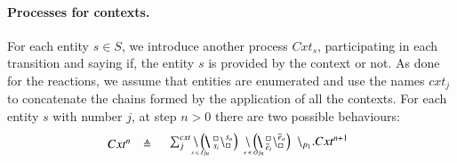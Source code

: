 \paragraph{Processes for contexts.}
For each entity $s \in S$, we introduce another process $Cxt_s$,  participating in each transition and saying if, the entity $s$ is provided by the context or not.
As done for the reactions, we assume that entities are enumerated and use the names $cxt_j$ to concatenate
the chains formed by the application of all the contexts. 
For each entity $s$ with number $j$, at step $n >0$  there are two possible behaviours: 
\[
\begin{array}{lcl}
Cxt^n &\defeq &
\begin{array}{ll}
\sum _{j}^{cxt} \backslash  \blockchain{s_i}{s_o}{s \in Ij_n} \, \link{}{} \blockchain{\overline{e}_i}{\overline{e}_o}{e \in Oj_n} \,  \backslash_{p_1}. Cxt^{n+1}\\
\end{array}
\end{array}
\]




